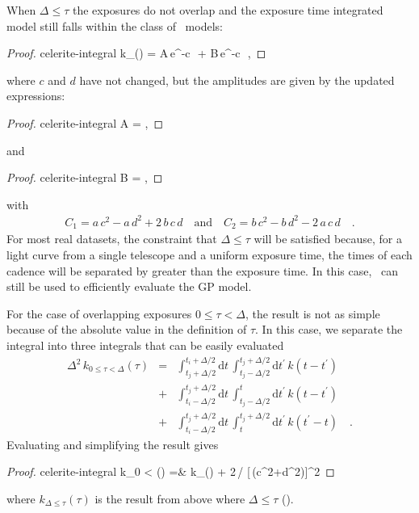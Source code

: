 \documentclass[modern]{aastex62}
\begin{document}
When $\Delta \le \tau$ the exposures do not overlap and the exposure time integrated model still falls within the class of \celerite\ models:
\begin{proof}{celerite-integral}
k_{\Delta \le \tau}(\tau) = A\,e^{-c\,\tau}\, + B\,e^{-c\,\tau}\, \quad,
\end{proof}
where $c$ and $d$ have not changed, but the amplitudes are given by the updated expressions:
\begin{proof}{celerite-integral}
  A = ,
\end{proof}
and
\begin{proof}{celerite-integral}
  B = ,
\end{proof}
with
\begin{align}
C_1 = a\,c^2 - a\,d^2 + 2\,b\,c\,d
\quad\mathrm{and}\quad
C_2 = b\,c^2 - b\,d^2 - 2\,a\,c\,d \quad.
\end{align}
For most real datasets, the constraint that $\Delta \le \tau$ will be satisfied because, for a light curve from a single telescope and a uniform exposure time, the times of each cadence will be separated by greater than the exposure time.
In this case, \celerite\ can still be used to efficiently evaluate the GP model.

For the case of overlapping exposures $0 \le \tau < \Delta$, the result is not as simple because of the absolute value in the definition of $\tau$.
In this case, we separate the integral into three integrals that can be easily evaluated
\begin{eqnarray}
  \Delta^2\,k_{0 \le \tau < \Delta}(\tau)
&=& \int_{t_j+\Delta/2}^{t_i+\Delta/2} \mathrm{d}t \,\int_{t_j-\Delta/2}^{t_j+\Delta/2}\mathrm{d}t^\prime\,k(t - t^\prime) \nonumber\\
&+& \int_{t_i-\Delta/2}^{t_j+\Delta/2} \mathrm{d}t \,\int_{t_j-\Delta/2}^{t}\mathrm{d}t^\prime\,k(t - t^\prime) \nonumber\\
&+& \int_{t_i-\Delta/2}^{t_j+\Delta/2} \mathrm{d}t \,\int_{t}^{t_j+\Delta/2}\mathrm{d}t^\prime\,k(t^\prime - t) \quad.
\end{eqnarray}
Evaluating and simplifying the result gives
\begin{proof}{celerite-integral}
k_{0 \le \tau < \Delta}(\tau) =& k_{\Delta\le\tau}(\tau) + 2\, / [\Delta\,(c^2+d^2)]^2
\end{proof}
where $k_{\Delta\le\tau}(\tau)$ is the result from above where $\Delta \le \tau$ ().
\end{document}
